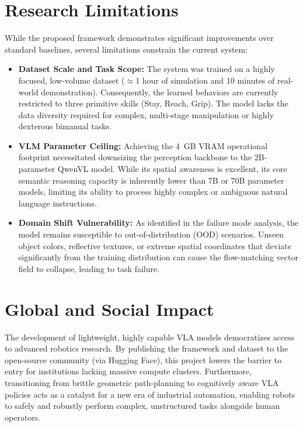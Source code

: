 \section{Research Limitations}
While the proposed framework demonstrates significant improvements over standard baselines, several limitations constrain the current system:
\begin{itemize}
    \item \textbf{Dataset Scale and Task Scope:} The system was trained on a highly focused, low-volume dataset ($\approx$1 hour of simulation and 10 minutes of real-world demonstration). Consequently, the learned behaviors are currently restricted to three primitive skills (Stay, Reach, Grip). The model lacks the data diversity required for complex, multi-stage manipulation or highly dexterous bimanual tasks.
    \item \textbf{VLM Parameter Ceiling:} Achieving the 4~GB VRAM operational footprint necessitated downsizing the perception backbone to the 2B-parameter QwenVL model. While its spatial awareness is excellent, its core semantic reasoning capacity is inherently lower than 7B or 70B parameter models, limiting its ability to process highly complex or ambiguous natural language instructions.
    \item \textbf{Domain Shift Vulnerability:} As identified in the failure mode analysis, the model remains susceptible to out-of-distribution (OOD) scenarios. Unseen object colors, reflective textures, or extreme spatial coordinates that deviate significantly from the training distribution can cause the flow-matching vector field to collapse, leading to task failure.
\end{itemize}

\section{Global and Social Impact}
The development of lightweight, highly capable VLA models democratizes access to advanced robotics research. By publishing the framework and dataset to the open-source community (via Hugging Face), this project lowers the barrier to entry for institutions lacking massive compute clusters. Furthermore, transitioning from brittle geometric path-planning to cognitively aware VLA policies acts as a catalyst for a new era of industrial automation, enabling robots to safely and robustly perform complex, unstructured tasks alongside human operators.

